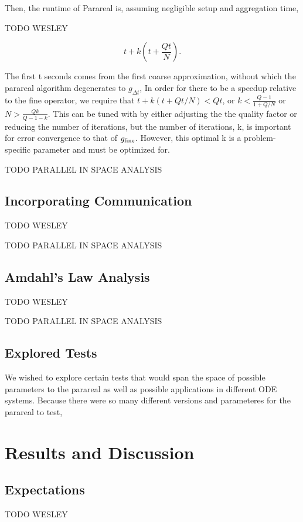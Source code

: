 \documentclass[letterpaper,12pt]{article}
\begin{document}
Then, the runtime of Parareal is, assuming negligible setup and
aggregation time,

TODO WESLEY

\begin{equation}
t + k(t + \frac{Qt}{N}).
\end{equation}

The first t seconds comes from the first coarse approximation, without which the parareal algorithm degenerates to $g_{\Delta t}$,  In order for there to be a speedup relative to the fine operator, we require
that $t + k(t + Qt/N) < Qt$, or $k < \frac{Q - 1}{1 + Q/N}$ or $N > \frac{Qk}{Q
- 1 - k}$. This can be tuned with by either adjusting the the quality factor or reducing the number of iterations, but the number of iterations, k, is important for error convergence to that of $g_{\textnormal{fine}}$.  However, this optimal k is a problem-specific parameter and must be optimized for.

TODO PARALLEL IN SPACE ANALYSIS

\subsection{Incorporating Communication}

TODO WESLEY

TODO PARALLEL IN SPACE ANALYSIS

\subsection{Amdahl's Law Analysis}

TODO WESLEY

TODO PARALLEL IN SPACE ANALYSIS

\subsection{Explored Tests}

We wished to explore certain tests that would span the space of possible
parameters to the parareal as well as possible applications in different ODE
systems. Because there were so many different versions and parameteres for the parareal to test,

\section{Results and Discussion}

\subsection{Expectations}
TODO WESLEY
\end{document}

